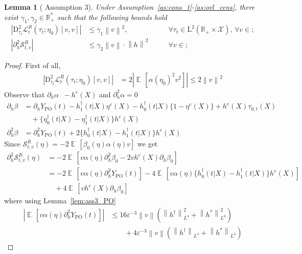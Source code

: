 \documentclass{article}
\newtheorem{lemma}[theorem]{Lemma}
\DeclareMathOperator*{\eqdef }{\,\stackrel{\text{def}}{=}\,}
\DeclareMathOperator{\EX}{\mathbb{E}\,}
\newcommand{\norm}[1]{\left\lVert#1\right\rVert}
\newcommand{\Rp}{\mathbb{R}_+}
\newcommand{\Rpstar}{\mathbb{R}_+^\ast}
\newcommand{\YPO}{Y_{\mathrm{PO}}}
\newcommand{\bD}{\mathrm{D}}
\begin{document}
\begin{lemma}[\citet{foster2023orthogonal} Assumption 3]
Under Assumption~\ref{as:cons_t}-\ref{as:ovl_cens}, there exist $\gamma_1,\gamma_2 \in \Rpstar$ such that 
the following bounds hold 
\begin{align*}
|\bD_{\tau_t}^2 \mathcal{L}^R_t(\tau_t; \eta_0)[v,v]|
&\leq \gamma_1 \norm{v}^2, 
&\qquad \forall \tau_t \in \mathrm{L}^2(\Rp \times \mathcal{X}),\, \forall v \in ; \\ %
|\partial_h^2 \mathcal{S}^R_{t,v}| 
&\leq \gamma_2 \norm{v} \cdot \norm{h}^2 
&\qquad \forall v \in; 
\end{align*}
\end{lemma}
\begin{proof}
First of all,
\begin{align*}
\left| \bD_{\tau_t}^2 \mathcal{L}^R_t(\tau_{t}; \eta_0)[v,v] \right|
&= 2 \left| \EX\!\left[\alpha(\eta_0)^2 v^2 \right] \right| \leq 2 \norm{v}^2  
\end{align*}
Observe that $\partial_h \alpha \eqdef - h^e(X)$ and $\partial_h^2 \alpha = 0$
\begin{align*}
\partial_h \beta &= \partial_h \YPO(t) - h^\dagger_1(t|X)\eta^e(X) 
- h_0^\dagger(t|X)\{1 - \eta^e(X)\} + h^e(X) \tau_{0,t}(X) \\ 
& \quad + \{ \eta_0^\dagger(t|X) - \eta_1^\dagger(t|X)\} h^e(X) \\
\partial^2_h \beta &= \partial^2_h \YPO(t) + 2\{ h^\dagger_0(t|X) - h^\dagger_1(t|X) \} h^e(X) 
\end{align*}
Since $\mathcal{S}^R_{t,v}(\eta) = -2 \EX\!\left[ \beta_0(\eta)\alpha(\eta) v\right]$ we get
\begin{align*}
\partial_h^2 \mathcal{S}^R_{t,v}(\eta) 
&= -2 \EX\!\left[ v\alpha(\eta)\partial^2_h\beta_0 - 2v h^e(X)\partial_h\beta_0 \right] \\
&= -2 \EX\!\left[ v\alpha(\eta)\partial^2_h \YPO(t) \right] 
- 4 \EX\!\left[ v\alpha(\eta) \{ h^\dagger_0(t|X) - h^\dagger_1(t|X) \} h^e(X) \right] \\
& \quad + 4 \EX\!\left[ v h^e(X)\partial_h\beta_0 \right]
\end{align*}
where using Lemma~\ref{lem:ass3_PO}
\begin{align*}
\left| \EX\!\left[ v\alpha(\eta)\partial^2_h \YPO(t) \right] \right| 
&\leq 16 \varepsilon^{-3} \norm{v}
\left(\norm{h^\dagger}_{L^4}^{2} + \norm{h^\ast}_{L^4}^2 \right) \\ 
& \qquad + 4 \varepsilon^{-3} \norm{v} 
\left( \norm{h^\dagger}_{L^4} + \norm{h^\ast}_{L^4}\right) 

\end{align*}
\end{proof}
\end{document}
